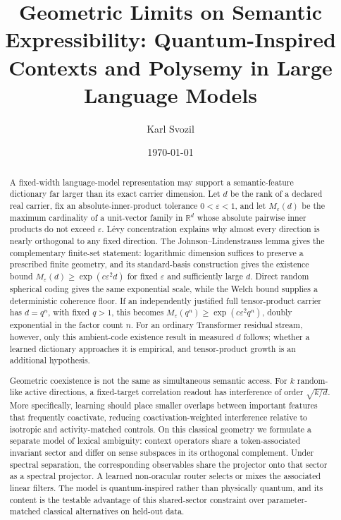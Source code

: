 \documentclass[
  aps,
  reprint,
  superscriptaddress,
  floatfix,
  nofootinbib,
  longbibliography
]{revtex4-2}
\newcommand{\R}{\mathbb{R}}
\begin{document}
\title{Geometric Limits on Semantic Expressibility: Quantum-Inspired Contexts and Polysemy in Large Language Models}

\author{Karl Svozil}

\date{\today}

\begin{abstract}
A fixed-width language-model representation may support a semantic-feature
dictionary far larger than its exact carrier dimension.  Let $d$ be the rank
of a declared real carrier, fix an absolute-inner-product tolerance
$0<\varepsilon<1$, and let $M_\varepsilon(d)$ be the maximum cardinality of a
unit-vector family in $\R^d$ whose absolute pairwise inner products do not
exceed $\varepsilon$.  L\'evy concentration explains why almost every
direction is nearly orthogonal to any fixed direction.  The
Johnson--Lindenstrauss lemma gives the complementary finite-set statement:
logarithmic dimension suffices to preserve a prescribed finite geometry, and
its standard-basis construction gives the existence bound
$M_\varepsilon(d)\geq\exp(c\varepsilon^2d)$ for fixed $\varepsilon$ and
sufficiently large $d$.  Direct random spherical coding gives the same
exponential scale, while the Welch bound supplies a deterministic coherence
floor.  If an independently justified full tensor-product carrier has
$d=q^n$, with fixed $q>1$, this becomes
$M_\varepsilon(q^n)\geq\exp(c\varepsilon^2q^n)$, doubly exponential in the
factor count $n$.  For an ordinary Transformer residual stream, however, only
this ambient-code existence result in measured $d$ follows; whether a learned
dictionary approaches it is empirical, and tensor-product growth is an
additional hypothesis.

Geometric coexistence is not the same as simultaneous semantic access.  For
$k$ random-like active directions, a fixed-target correlation readout has
interference of order $\sqrt{k/d}$.  More specifically, learning should place
smaller overlaps between important features that frequently coactivate,
reducing coactivation-weighted interference relative to isotropic and
activity-matched controls.  On this classical geometry we formulate a
separate model of lexical ambiguity: context operators share a token-associated
invariant sector and differ on sense subspaces in its orthogonal complement.
Under spectral separation, the corresponding observables share the projector
onto that sector as a spectral projector.  A learned non-oracular router
selects or mixes the associated linear filters.
The model is quantum-inspired rather than physically quantum, and its content
is the testable advantage of this shared-sector constraint over
parameter-matched classical alternatives on held-out data.
\end{abstract}
\end{document}
